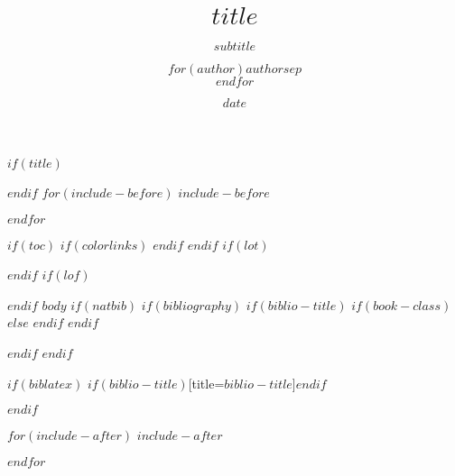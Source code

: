 \documentclass[$for(classoption)$$classoption$$sep$,$endfor$]{$documentclass$}
\title{$title$}
\subtitle{$subtitle$}
\author{$for(author)$$author$$sep$ \\ $endfor$}
\date{$date$}
\institute{$institute$}
\begin{document}
$if(title)$
\maketitle
$endif$
$for(include-before)$
$include-before$

$endfor$

$if(toc)$
{
$if(colorlinks)$
\hypersetup{linkcolor=$if(toccolor)$$toccolor$$else$black$endif$}
$endif$
\setcounter{tocdepth}{$toc-depth$}
\tableofcontents
}
$endif$
$if(lot)$
\listoftables
$endif$
$if(lof)$
\listoffigures
$endif$
$body$
$if(natbib)$
$if(bibliography)$
$if(biblio-title)$
$if(book-class)$
\renewcommand\bibname{$biblio-title$}
$else$
\renewcommand\refname{$biblio-title$}
$endif$
$endif$


$endif$
$endif$

$if(biblatex)$
\printbibliography$if(biblio-title)$[title=$biblio-title$]$endif$

$endif$

$for(include-after)$
$include-after$

$endfor$
\end{document}
